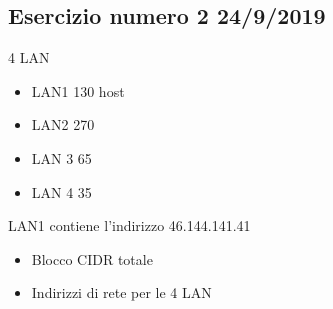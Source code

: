 \documentclass[a4paper]{article}
\begin{document}
\subsection{Esercizio numero 2 24/9/2019}

4 LAN

\begin{itemize}
    \item LAN1 130 host
    \item LAN2 270
    \item LAN 3 65
    \item LAN 4 35
\end{itemize}

LAN1 contiene l'indirizzo 46.144.141.41
\begin{itemize}
    \item Blocco CIDR totale
    \item Indirizzi di rete per le 4 LAN
\end{itemize}
\end{document}
